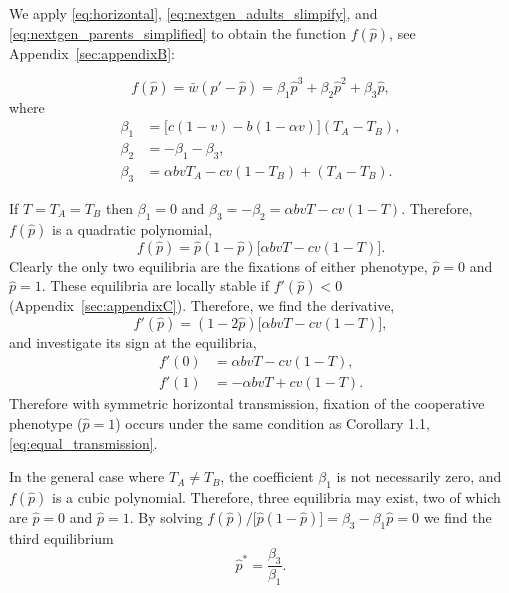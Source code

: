 \documentclass[12pt]{extarticle}
\begin{document}
{%
We apply \autoref{eq:horizontal}, \autoref{eq:nextgen_adults_slimpify}, and \autoref{eq:nextgen_parents_simplified} to obtain the function $f(\hat{p})$, see Appendix~\autoref{sec:appendixB}:

\begin{equation} \label{eq:general_case_polynomial}
  f(\hat{p}) = \bar{w}(\hat{p}'-\hat{p}) =
  \beta_1 \hat{p}^3 + \beta_2 \hat{p}^2 + \beta_3 \hat{p},
\end{equation}
where 
\begin{equation} \label{eq:polynomial_coefficients}
\begin{aligned}
\beta_1 &= \big[c(1-v) - b (1-\alpha v)\big] (T_A-T_B) , \\
\beta_2 &= -\beta_1 -\beta_3 ,  \\
\beta_3 &= \alpha bvT_A - cv(1-T_B) + (T_A-T_B) .
\end{aligned}
\end{equation}

If $T=T_A=T_B$ then $\beta_1=0$ and $\beta_3=-\beta_2=\alpha b vT -cv(1-T)$. 
Therefore, $f(\hat{p})$ is a quadratic polynomial,
\begin{equation} \label{eq:equal_horizontal_transmission}
  f(\hat{p}) = \hat{p}(1-\hat{p})\big[\alpha bvT - cv(1-T)\big].
\end{equation}
Clearly the only two equilibria are the fixations of either phenotype, $\hat{p} =  0$ and $\hat{p} = 1$.
These equilibria are locally stable if $f'(\hat{p})<0$ (Appendix~\autoref{sec:appendixC}).
Therefore, we find the derivative,
\begin{equation}
f'(\hat{p})=(1-2\hat{p})\big[\alpha bvT - cv(1-T)\big],
\end{equation}
and investigate its sign at the equilibria,
\begin{equation} \label{eq:derivative_of_phattag-phat}
\begin{aligned}
	f'(0) &=	\alpha bvT - cv(1-T), \\
	f'(1) &=	-\alpha bvT + cv(1-T).
\end{aligned}
\end{equation}
Therefore with symmetric horizontal transmission, fixation of the cooperative phenotype ($\hat{p}=1$) occurs under the same condition as Corollary 1.1, \autoref{eq:equal_transmission}.


In the general case where $T_A \neq T_B$, the coefficient $\beta_1$ is not necessarily zero, and $f(\hat{p})$ is a cubic polynomial.
Therefore, three equilibria may exist, two of which are
$\hat{p} = 0 $ and $\hat{p} = 1$.
By solving $f(\hat{p})/\big[\hat{p}(1-\hat{p})\big] = \beta_3 -\beta_1 \hat{p} = 0$ we  find the third equilibrium
\begin{equation} \label{eq:oblique_and_vertic_result}
  \hat{p}^* =  
  \frac{\beta_3}{\beta_1}.
\end{equation}

}
\end{document}

